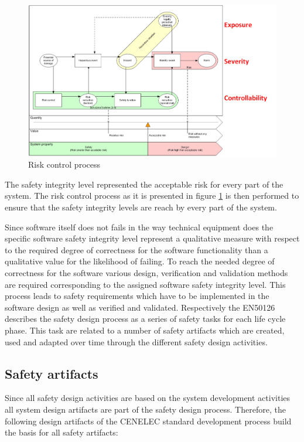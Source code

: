 \documentclass{template/openetcs_article}
\begin{document}
\begin{figure}[htbp]
\centering
\includegraphics[width=0.7\linewidth]{bld_2013-06-19_Risk-control-modell_1-0_jw}
\caption{Risk control process \cite{Schnieder.2013}}
\label{fig:Risk-control-modell-eng}
\end{figure}

The safety integrity level represented the acceptable risk for every part of the system. The risk control process as it is presented in figure \ref{fig:Risk-control-modell-eng} is then performed to ensure that the safety integrity levels are reach by every part of the system.

Since software itself does not fails in the way technical equipment does the specific software safety integrity level represent a qualitative measure with respect to the required degree of correctness for the software functionality than a qualitative value for the likelihood of failing. To reach the needed degree of correctness for the software various design, verification and validation methods are required corresponding to the assigned software safety integrity level. This process leads to safety requirements which have to be implemented in the software design as well as verified and validated. Respectively the EN50126 describes the safety design process as a series of safety tasks for each life cycle phase. This task are related to a number of safety artifacts which are created, used and adapted over time through the different safety design activities.

\subsection{Safety artifacts}

Since all safety design activities are based on the system development activities all system design artifacts are part of the safety design process. Therefore, the following design artifacts of the CENELEC standard development process build the basis for all safety artifacts:
\end{document}
